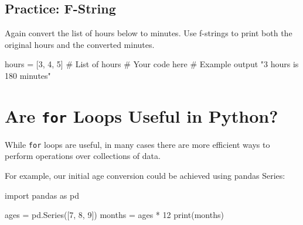 \documentclass[
  letterpaper,
  DIV=11,
  numbers=noendperiod]{scrreprt}
\newenvironment{Shaded}{\begin{snugshade}}{\end{snugshade}}
\newcommand{\BuiltInTok}[1]{\textcolor[rgb]{0.00,0.23,0.31}{#1}}
\newcommand{\CommentTok}[1]{\textcolor[rgb]{0.37,0.37,0.37}{#1}}
\newcommand{\DecValTok}[1]{\textcolor[rgb]{0.68,0.00,0.00}{#1}}
\newcommand{\ImportTok}[1]{\textcolor[rgb]{0.00,0.46,0.62}{#1}}
\newcommand{\NormalTok}[1]{\textcolor[rgb]{0.00,0.23,0.31}{#1}}
\newcommand{\OperatorTok}[1]{\textcolor[rgb]{0.37,0.37,0.37}{#1}}
\begin{document}
\begin{tcolorbox}[enhanced jigsaw, colframe=quarto-callout-tip-color-frame, opacityback=0, titlerule=0mm, bottomrule=.15mm, breakable, leftrule=.75mm, colbacktitle=quarto-callout-tip-color!10!white, title=\textcolor{quarto-callout-tip-color}{\faLightbulb}\hspace{0.5em}{Practice}, rightrule=.15mm, coltitle=black, opacitybacktitle=0.6, colback=white, left=2mm, arc=.35mm, toptitle=1mm, bottomtitle=1mm, toprule=.15mm]

\subsection{Practice: F-String}\label{practice-f-string}

Again convert the list of hours below to minutes. Use f-strings to print
both the original hours and the converted minutes.

\begin{Shaded}
\begin{Highlighting}[]
\NormalTok{hours }\OperatorTok{=}\NormalTok{ [}\DecValTok{3}\NormalTok{, }\DecValTok{4}\NormalTok{, }\DecValTok{5}\NormalTok{]  }\CommentTok{\# List of hours}
\CommentTok{\# Your code here}
\CommentTok{\# Example output "3 hours is 180 minutes"}
\end{Highlighting}
\end{Shaded}

\end{tcolorbox}

\section{\texorpdfstring{Are \texttt{for} Loops Useful in
Python?}{Are for Loops Useful in Python?}}\label{are-for-loops-useful-in-python}

While \texttt{for} loops are useful, in many cases there are more
efficient ways to perform operations over collections of data.

For example, our initial age conversion could be achieved using pandas
Series:

\begin{Shaded}
\begin{Highlighting}[]
\ImportTok{import}\NormalTok{ pandas }\ImportTok{as}\NormalTok{ pd}

\NormalTok{ages }\OperatorTok{=}\NormalTok{ pd.Series([}\DecValTok{7}\NormalTok{, }\DecValTok{8}\NormalTok{, }\DecValTok{9}\NormalTok{])}
\NormalTok{months }\OperatorTok{=}\NormalTok{ ages }\OperatorTok{*} \DecValTok{12}
\BuiltInTok{print}\NormalTok{(months)}
\end{Highlighting}
\end{Shaded}
\end{document}
